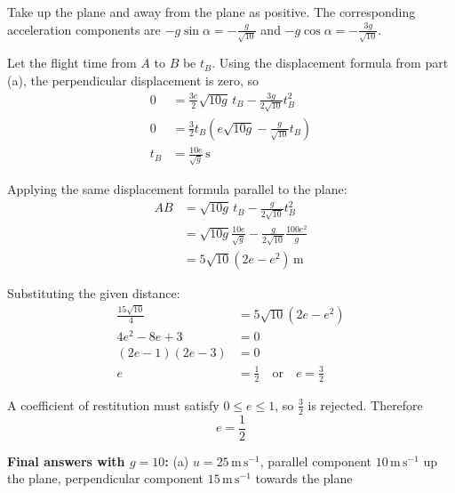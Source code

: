 \documentclass[leqno]{article}
\begin{document}
\begin{enumerate}[
  label=\textbf{\arabic*.},
  leftmargin=*,
  topsep=0pt,
  partopsep=0pt,
  parsep=0pt
]
\begin{djsSolution}
\begin{enumerate}[label=\textbf{(\alph*)}, start=1]
Take up the plane and away from the plane as positive. The corresponding acceleration components are \(-g\sin\alpha=-\frac{g}{\sqrt{10}}\) and \(-g\cos\alpha=-\frac{3g}{\sqrt{10}}\).

Let the flight time from \(A\) to \(B\) be \(t_B\). Using the displacement formula from part (a), the perpendicular displacement is zero, so
\begin{align*}
0&=\frac{3e}{2}\sqrt{10g}\,t_B-\frac{3g}{2\sqrt{10}}t_B^2\\
0&=\frac32t_B\left(e\sqrt{10g}-\frac{g}{\sqrt{10}}t_B\right)\\
t_B&=\frac{10e}{\sqrt g}\,\mathrm{s}
\end{align*}

Applying the same displacement formula parallel to the plane:
\begin{align*}
AB&=\sqrt{10g}\,t_B-\frac{g}{2\sqrt{10}}t_B^2\\
&=\sqrt{10g}\frac{10e}{\sqrt g}
-\frac{g}{2\sqrt{10}}\frac{100e^2}{g}\\
&=5\sqrt{10}(2e-e^2)\,\mathrm{m}
\end{align*}

Substituting the given distance:
\begin{align*}
\frac{15\sqrt{10}}4&=5\sqrt{10}(2e-e^2)\\
4e^2-8e+3&=0\\
(2e-1)(2e-3)&=0\\
e&=\frac12\quad\text{or}\quad e=\frac32
\end{align*}

A coefficient of restitution must satisfy \(0\leq e\leq1\), so \(\frac32\) is rejected. Therefore
\[
e=\frac12
\]

\end{enumerate}
\par\medskip\noindent\textbf{Final answers with \(g = 10\):} (a) \(u=25\,\mathrm{m\,s^{-1}}\), parallel component \(10\,\mathrm{m\,s^{-1}}\) up the plane, perpendicular component \(15\,\mathrm{m\,s^{-1}}\) towards the plane
\end{djsSolution}

\newpage

\questionitem


\end{enumerate}
\end{document}
